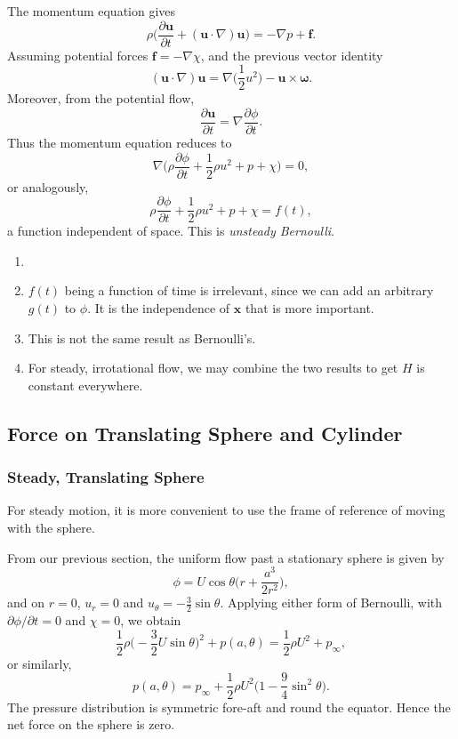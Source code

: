 \documentclass[12pt]{article}
\begin{document}
The momentum equation gives
\[
\rho \biggl( \frac{\partial \mathbf{u}}{\partial t} + (\mathbf{u} \cdot \nabla) \mathbf{u} \biggr) = - \nabla p + \mathbf{f}.
\]
Assuming potential forces $\mathbf{f} = - \nabla \chi$, and the previous vector identity
\[
	(\mathbf{u} \cdot \nabla) \mathbf{u} = \nabla \biggl( \frac{1}{2} u^2 \biggr) - \mathbf{u} \times \bm{\omega}.
\]
Moreover, from the potential flow,
\[
\frac{\partial \mathbf{u}}{\partial t} = \nabla \frac{\partial \phi}{\partial t}.
\]
Thus the momentum equation reduces to
\[
\nabla \biggl( \rho \frac{\partial \phi}{\partial t} + \frac{1}{2} \rho u^2 + p + \chi \biggr) = 0,
\]
or analogously,
\[
\rho \frac{\partial \phi}{\partial t} + \frac{1}{2} \rho u^2 + p + \chi = f(t),
\]
a function independent of space. This is \emph{unsteady Bernoulli}.
\begin{remark}
	\begin{enumerate}
		\item[]
		\item $f(t)$ being a function of time is irrelevant, since we can add an arbitrary $g(t)$ to $\phi$. It is the independence of $\mathbf{x}$ that is more important.
		\item This is not the same result as Bernoulli's.
		\item For steady, irrotational flow, we may combine the two results to get $H$ is constant everywhere.
	\end{enumerate}
\end{remark}

\subsection{Force on Translating Sphere and Cylinder}
\label{sub:force_on_translating_sphere_and_cylinder}

\subsubsection{Steady, Translating Sphere}
\label{subsub:steady_translating_sphere}

For steady motion, it is more convenient to use the frame of reference of moving with the sphere.

From our previous section, the uniform flow past a stationary sphere is given by
\[
\phi = U \cos \theta \biggl( r + \frac{a^3}{2r^2} \biggr),
\]
and on $r = 0$, $u_r = 0$ and $u_{\theta} = - \frac{3}{2} \sin \theta$. Applying either form of Bernoulli, with $\partial \phi/\partial t = 0$ and $\chi = 0$, we obtain
\[
\frac{1}{2} \rho \biggl( - \frac{3}{2} U \sin \theta \biggr)^2 + p(a, \theta) = \frac{1}{2} \rho U^2 + p_{\infty},
\]
or similarly,
\[
p(a, \theta) = p_{\infty} + \frac{1}{2} \rho U^2 \biggl( 1 - \frac{9}{4} \sin^2 \theta \biggr).
\]
The pressure distribution is symmetric fore-aft and round the equator. Hence the net force on the sphere is zero.
\end{document}
